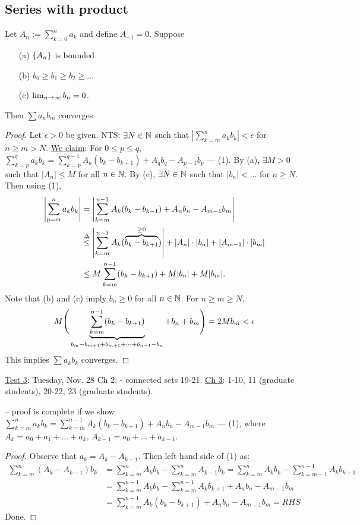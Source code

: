 \documentclass[]{article}
\begin{document}
\subsection{Series with product}

\begin{theorem}
	Let $A_n:=\sum_{k=0}^n a_k$ and define $A_{-1}=0$. Suppose
	\begin{enumerate}
		\item[(a)] $\set{A_n}$ is bounded
		\item[(b)] $b_0\geq b_1\geq b_2\geq \dots$
		\item[(c)] $\lim_{n\ra\infty} b_n = 0$.
	\end{enumerate}
	Then $\sum a_nb_m$ converges.
	\label{thm-3-42}
\end{theorem}

\begin{proof}
	Let $\epsilon>0$ be given. NTS: $\exists N\in\mb N$ such that $|\sum_{k=m}^n a_kb_k|<\epsilon$ for $n\geq m>N$.
	\ul{We claim}: For $0\leq p\leq q$, $\sum_{k=p}^q a_kb_k = \sum_{k=p}^{q-1} A_k(b_k-b_{k+1}) + A_qb_q - A_{p-1}b_p$ --- (1).
	By (a), $\exists M>0$ such that $|A_n|\leq M$ for all $n\in\mb N$.
	By (c), $\exists N\in\mb N$ such that $|b_n|<\dots$ for $n\geq N$.
	Then using (1), 
	\begin{align*}
		\left|\sum_{p=m}^n a_kb_k\right| &= \left|\sum_{k=m}^{n-1} A_k(b_k-b_{k-1}) + A_nb_n - A_{m-1}b_m\right| \\
										 &\os{\Delta}{\leq} \left|\sum_{k=m}^{n-1} A_k(\ob{\geq0}{b_k-b_{k+1}})\right| + |A_n|\cdot|b_n| + |A_{m-1}|\cdot|b_m| \\
										 &\leq M\sum_{k=m}^{n-1} (b_k-b_{k+1}) + M|b_n| + M|b_m|.
	\end{align*}
	Note that (b) and (c) imply $b_n\geq 0$ for all $n\in\mb N$. For $n\geq m\geq N$,
	$$M\Bigg(\ub{b_m-b_{m+1}+b_{m+1}+\dots+b_{n-1}-b_n}{\sum_{k=m}^{n-1}(b_k-b_{k+1})}+b_n+b_m\Bigg) = 2Mb_m <\epsilon$$ 
	This implies $\sum a_k b_k$ converges.
\end{proof}

\ul{Test 3}: Tuesday, Nov. 28
Ch 2: - connected sets 19-21.
\ul{Ch 3}: 1-10, 11 (graduate students), 20-22, 23 (graduate students).

\begin{recall}
	-- proof is complete if we show $\sum_{k=m}^n a_kb_k = \sum_{k=m}^{n-1} A_k(b_k-b_{k+1}) + A_n b_n - A_{m-1}b_m$ --- (1), where $A_k = a_0+a_1+\dots+a_k$, $A_{k-1} = a_0+\dots+a_{k-1}$.
\end{recall}
\begin{proof}
	Observe that $a_k=A_k-A_{k-1}$. Then left hand side of (1) as:
	\begin{align*}
		\sum_{k=m}^n(A_k - A_{k-1})b_k &= \sum_{k=m}^n A_kb_k - \sum_{k=m}^n A_{k-1} b_k
		= \sum_{k=m}^n A_kb_k - \sum_{k=m-1}^{n-1} A_k b_{k+1} \\
									   &= \sum_{k=m}^{n-1} A_kb_k - \sum_{k=m}^{n-1} A_k b_{k+1} + A_n b_n - A_{m-1}b_m \\
									   &= \sum_{k=m}^{n-1} A_k(b_k-b_{k+1})+A_nb_n - A_{m-1} b_m = RHS
	\end{align*}
	Done.
\end{proof}
\end{document}
